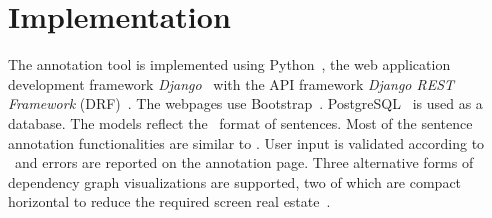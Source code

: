 \section{Implementation}
\label{sec:implementation}

The annotation tool is implemented using  Python~\cite{python}, the web application development framework \textit{Django}~\cite{django} with the API framework \textit{Django REST Framework} (DRF)~\cite{drf}. The webpages use Bootstrap~\cite{bootstrap}.
PostgreSQL~\cite{psql} is used as a database.
The models reflect the \ud\ format of sentences.
Most of the sentence annotation functionalities are similar to \boatvone.
User input is validated according to  \ud\ and errors are reported on the annotation page.
Three alternative forms of dependency graph visualizations are supported, two of which are compact horizontal to reduce the required screen real estate~\cite{spacy,spyssalo}.


